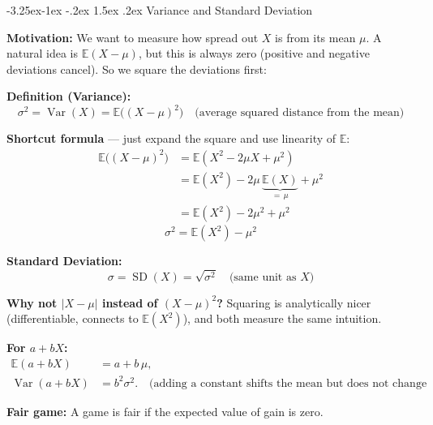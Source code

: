 \documentclass{article}
\makeatletter
\theoremstyle{remark}
\newlength{\subsecindent}
\renewcommand\subsection{\@startsection{subsection}{2}{\subsecindent}%
  {-3.25ex\@plus -1ex \@minus -.2ex}%
  {1.5ex \@plus .2ex}%
  {\normalfont\large\bfseries}}
\newenvironment{sub}{%
  \begin{list}{}{%
    \setlength{\leftmargin}{4em}%
    \setlength{\rightmargin}{0pt}%
    \setlength{\topsep}{0pt}%
    \setlength{\partopsep}{0pt}%
    \setlength{\parsep}{\parskip}%
    \setlength{\itemsep}{\parskip}%
  }\item\relax
}{\end{list}}
\newcommand{\E}{\mathbb{E}}
\newcommand{\Var}{\operatorname{Var}}
\newcommand{\SD}{\operatorname{SD}}
\makeatother
\begin{document}
\subsection{Variance and Standard Deviation}
\begin{sub}

\textbf{Motivation:} We want to measure how spread out $X$ is from its mean $\mu$.
A natural idea is $\E(X - \mu)$, but this is always zero (positive and negative
deviations cancel). So we square the deviations first:

\textbf{Definition (Variance):}
\[
  \sigma^2 = \Var(X) = \E\bigl((X - \mu)^2\bigr)
  \quad \text{(average squared distance from the mean)}
\]

\textbf{Shortcut formula} --- just expand the square and use linearity of $\E$:
\begin{align*}
  \E\bigl((X-\mu)^2\bigr)
    &= \E(X^2 - 2\mu X + \mu^2) \\
    &= \E(X^2) - 2\mu\,\underbrace{\E(X)}_{=\,\mu} + \mu^2 \\
    &= \E(X^2) - 2\mu^2 + \mu^2
\end{align*}
\[
  \boxed{\sigma^2 = \E(X^2) - \mu^2}
\]

\textbf{Standard Deviation:}
\[
  \boxed{\sigma = \SD(X) = \sqrt{\sigma^2}}
  \quad \text{(same unit as } X \text{)}
\]

\textbf{Why not $|X - \mu|$ instead of $(X-\mu)^2$?} Squaring is analytically nicer
(differentiable, connects to $\E(X^2)$), and both measure the same intuition.

\textbf{For $a + bX$:}
\begin{align*}
  \E(a + bX) &= a + b\,\mu, \\
  \Var(a + bX) &= b^2 \sigma^2.
  \quad \text{(adding a constant shifts the mean but does not change spread)}
\end{align*}

\textbf{Fair game:} A game is fair if the expected value of gain is zero.

\end{sub}
\end{document}
